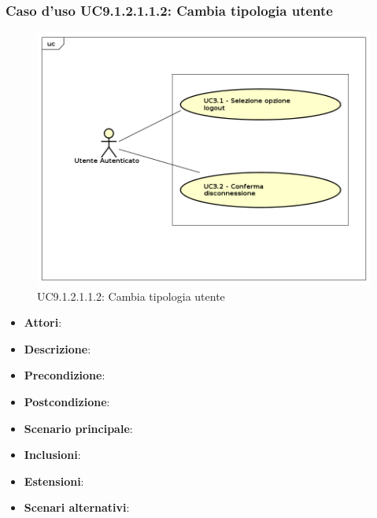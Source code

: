 						\subsubsection{Caso d'uso UC9.1.2.1.1.2: Cambia tipologia utente}
						\label{UC9.1.2.1.1.2}
						\begin{figure}[h]
							\centering
							\includegraphics[scale=0.7,keepaspectratio]{UML/UC9.png}
							\caption{UC9.1.2.1.1.2: Cambia tipologia utente}
						\end{figure}
						\FloatBarrier
						\begin{itemize}
							\item \textbf{Attori}: 
							\item \textbf{Descrizione}: 
							\item \textbf{Precondizione}: 
							\item \textbf{Postcondizione}: 
							\item \textbf{Scenario principale}:
							\item \textbf{Inclusioni}:
							\item \textbf{Estensioni}:
							\item \textbf{Scenari alternativi}:
						\end{itemize}
						
